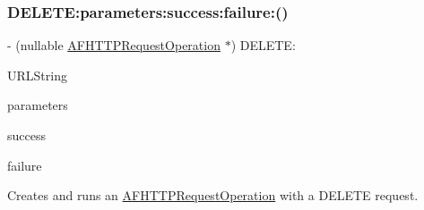 \subsubsection{\texorpdfstring{D\+E\+L\+E\+T\+E\+:parameters\+:success\+:failure\+:()}{DELETE:parameters:success:failure:()}\hspace{0.1cm}{\footnotesize\ttfamily [1/3]}}
{\footnotesize\ttfamily -\/ (nullable \mbox{\hyperlink{interface_a_f_h_t_t_p_request_operation}{A\+F\+H\+T\+T\+P\+Request\+Operation}} $\ast$) D\+E\+L\+E\+T\+E\+: \begin{DoxyParamCaption}\item[{(N\+S\+String $\ast$)}]{U\+R\+L\+String }\item[{parameters:(nullable id)}]{parameters }\item[{success:(nullable void($^\wedge$)(\mbox{\hyperlink{interface_a_f_h_t_t_p_request_operation}{A\+F\+H\+T\+T\+P\+Request\+Operation}} $\ast$operation, id response\+Object))}]{success }\item[{failure:(nullable void($^\wedge$)(\mbox{\hyperlink{interface_a_f_h_t_t_p_request_operation}{A\+F\+H\+T\+T\+P\+Request\+Operation}} $\ast$\+\_\+\+\_\+nullable operation, N\+S\+Error $\ast$error))}]{failure }\end{DoxyParamCaption}}

Creates and runs an {\ttfamily \mbox{\hyperlink{interface_a_f_h_t_t_p_request_operation}{A\+F\+H\+T\+T\+P\+Request\+Operation}}} with a {\ttfamily D\+E\+L\+E\+TE} request.



